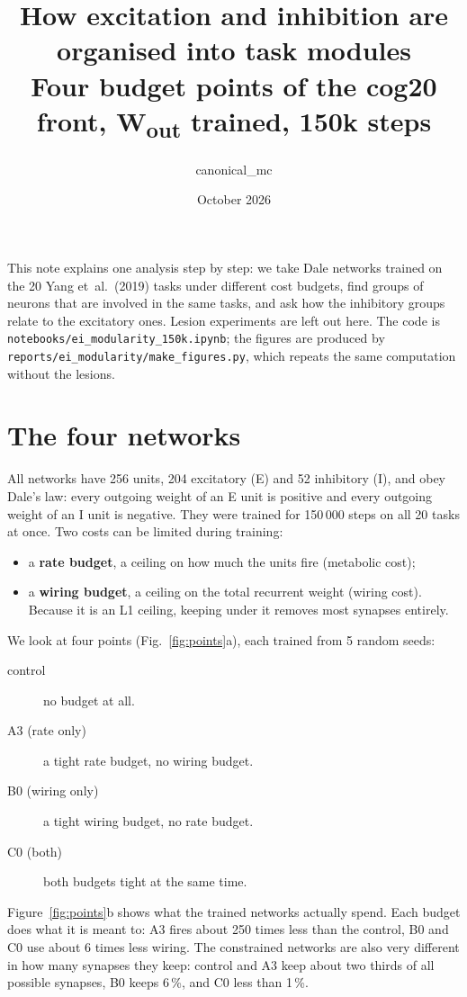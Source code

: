 \documentclass[11pt,a4paper]{article}
\title{How excitation and inhibition are organised into task modules\\
\large Four budget points of the cog20 front, W\textsubscript{out} trained, 150k steps}
\author{canonical\_mc}
\date{October 2026}
\begin{document}
\maketitle

\noindent
This note explains one analysis step by step: we take Dale networks trained on the 20 Yang et~al.\ (2019) tasks
under different cost budgets, find groups of neurons that are involved in the same tasks, and ask how the
inhibitory groups relate to the excitatory ones. Lesion experiments are left out here.
The code is \texttt{notebooks/ei\_modularity\_150k.ipynb}; the figures are produced by
\texttt{reports/ei\_modularity/make\_figures.py}, which repeats the same computation without the lesions.

\section{The four networks}

All networks have 256 units, 204 excitatory (E) and 52 inhibitory (I), and obey Dale's law: every outgoing
weight of an E unit is positive and every outgoing weight of an I unit is negative. They were trained for 150\,000
steps on all 20 tasks at once. Two costs can be limited during training:

\begin{itemize}
  \item a \textbf{rate budget}, a ceiling on how much the units fire (metabolic cost);
  \item a \textbf{wiring budget}, a ceiling on the total recurrent weight (wiring cost). Because it is an L1
  ceiling, keeping under it removes most synapses entirely.
\end{itemize}

We look at four points (Fig.~\ref{fig:points}a), each trained from 5 random seeds:

\begin{description}
  \item[control] no budget at all.
  \item[A3 (rate only)] a tight rate budget, no wiring budget.
  \item[B0 (wiring only)] a tight wiring budget, no rate budget.
  \item[C0 (both)] both budgets tight at the same time.
\end{description}

Figure~\ref{fig:points}b shows what the trained networks actually spend. Each budget does what it is meant to:
A3 fires about 250 times less than the control, B0 and C0 use about 6 times less wiring. The constrained
networks are also very different in how many synapses they keep: control and A3 keep about two thirds of all
possible synapses, B0 keeps 6\,\%, and C0 less than 1\,\%.
\end{document}
